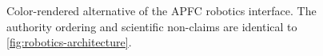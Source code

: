 \begin{figure}[t]
\centering
\begingroup
\def\RobotPlateAsset{figures/assets/apfc_humanoid_cad_color.png}
\resizebox{\textwidth}{!}{}
\endgroup
\caption{Color-rendered alternative of the APFC robotics interface.  The
authority ordering and scientific non-claims are identical to
\cref{fig:robotics-architecture}.}
\label{fig:robotics-architecture-color}
\end{figure}
